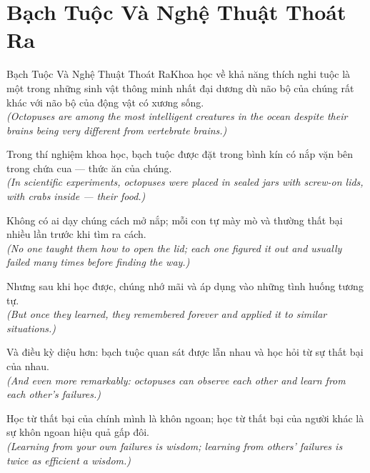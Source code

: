 \section{Bạch Tuộc Và Nghệ Thuật Thoát Ra}
\begin{truyen}{Bạch Tuộc Và Nghệ Thuật Thoát Ra}{Khoa học về khả năng thích nghi}
 tuộc là một trong những sinh vật thông minh nhất đại dương dù não bộ của chúng rất khác với não bộ của động vật có xương sống.\\[4pt]
\textit{(Octopuses are among the most intelligent creatures in the ocean despite their brains being very different from vertebrate brains.)}

Trong thí nghiệm khoa học, bạch tuộc được đặt trong bình kín có nắp vặn bên trong chứa cua --- thức ăn của chúng.\\[4pt]
\textit{(In scientific experiments, octopuses were placed in sealed jars with screw-on lids, with crabs inside --- their food.)}

Không có ai dạy chúng cách mở nắp; mỗi con tự mày mò và thường thất bại nhiều lần trước khi tìm ra cách.\\[4pt]
\textit{(No one taught them how to open the lid; each one figured it out and usually failed many times before finding the way.)}

Nhưng sau khi học được, chúng nhớ mãi và áp dụng vào những tình huống tương tự.\\[4pt]
\textit{(But once they learned, they remembered forever and applied it to similar situations.)}

Và điều kỳ diệu hơn: bạch tuộc quan sát được lẫn nhau và học hỏi từ sự thất bại của nhau.\\[4pt]
\textit{(And even more remarkably: octopuses can observe each other and learn from each other's failures.)}

\end{truyen}
\begin{baihoc}
  Học từ thất bại của chính mình là khôn ngoan; học từ thất bại của người khác là sự khôn ngoan hiệu quả gấp đôi.\\[4pt]
  \textit{(Learning from your own failures is wisdom; learning from others' failures is twice as efficient a wisdom.)}
\end{baihoc}

